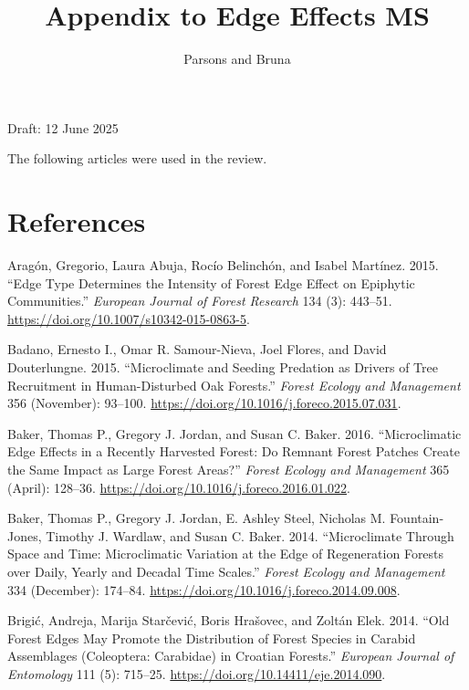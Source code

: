 \documentclass[
  12pt,
]{article}
\title{Appendix to Edge Effects MS}
\author{Parsons and Bruna}
\date{}
\newlength{\cslhangindent}
\newenvironment{CSLReferences}[2] %
 {\begin{list}{}{%
  \setlength{\itemindent}{0pt}
  \setlength{\leftmargin}{0pt}
  \setlength{\parsep}{0pt}
  \ifodd #1
   \setlength{\leftmargin}{\cslhangindent}
   \setlength{\itemindent}{-1\cslhangindent}
  \fi
  \setlength{\itemsep}{#2\baselineskip}}}
 {\end{list}}
\begin{document}
\maketitle

Draft: 12 June 2025

The following articles were used in the review.

\section*{References}\label{references}

\label{refs}
\begin{CSLReferences}{1}{0}
Aragón, Gregorio, Laura Abuja, Rocío Belinchón, and Isabel Martínez.
2015. {``Edge Type Determines the Intensity of Forest Edge Effect on
Epiphytic Communities.''} \emph{European Journal of Forest Research} 134
(3): 443--51. \url{https://doi.org/10.1007/s10342-015-0863-5}.

Badano, Ernesto I., Omar R. Samour-Nieva, Joel Flores, and David
Douterlungne. 2015. {``Microclimate and Seeding Predation as Drivers of
Tree Recruitment in Human-Disturbed Oak Forests.''} \emph{Forest Ecology
and Management} 356 (November): 93--100.
\url{https://doi.org/10.1016/j.foreco.2015.07.031}.

Baker, Thomas P., Gregory J. Jordan, and Susan C. Baker. 2016.
{``Microclimatic Edge Effects in a Recently Harvested Forest: {Do}
Remnant Forest Patches Create the Same Impact as Large Forest Areas?''}
\emph{Forest Ecology and Management} 365 (April): 128--36.
\url{https://doi.org/10.1016/j.foreco.2016.01.022}.

Baker, Thomas P., Gregory J. Jordan, E. Ashley Steel, Nicholas M.
Fountain-Jones, Timothy J. Wardlaw, and Susan C. Baker. 2014.
{``Microclimate Through Space and Time: {Microclimatic} Variation at the
Edge of Regeneration Forests over Daily, Yearly and Decadal Time
Scales.''} \emph{Forest Ecology and Management} 334 (December): 174--84.
\url{https://doi.org/10.1016/j.foreco.2014.09.008}.

Brigić, Andreja, Marija Starčević, Boris Hrašovec, and Zoltán Elek.
2014. {``Old Forest Edges May Promote the Distribution of Forest Species
in Carabid Assemblages ({Coleoptera}: {Carabidae}) in {Croatian}
Forests.''} \emph{European Journal of Entomology} 111 (5): 715--25.
\url{https://doi.org/10.14411/eje.2014.090}.


\end{CSLReferences}
\end{document}
